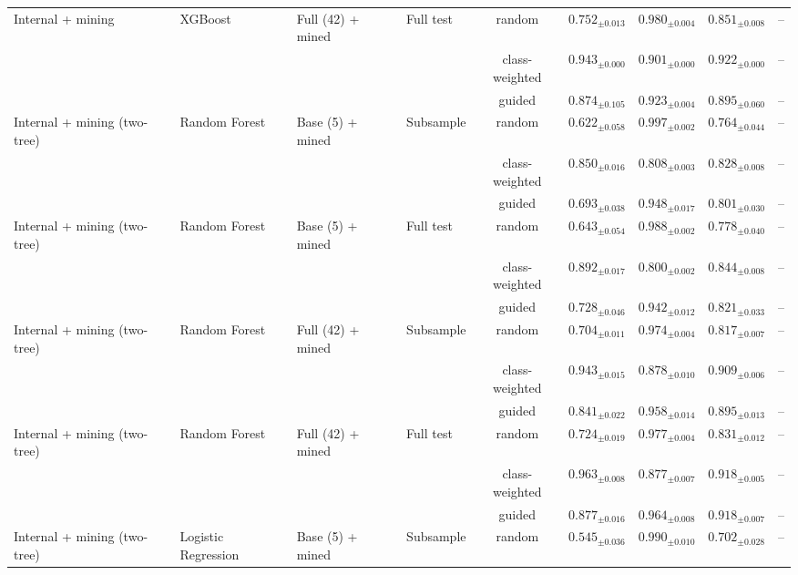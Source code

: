 \begin{longtable}{llllcccc}
\addlinespace
Internal + mining & XGBoost & Full (42) + mined & Full test & random & $0.752_{\pm 0.013}$ & $0.980_{\pm 0.004}$ & $0.851_{\pm 0.008}$ & -- \\
 &  &  &  & class-weighted & $0.943_{\pm 0.000}$ & $0.901_{\pm 0.000}$ & $0.922_{\pm 0.000}$ & -- \\
 &  &  &  & guided & $0.874_{\pm 0.105}$ & $0.923_{\pm 0.004}$ & $0.895_{\pm 0.060}$ & -- \\
\addlinespace
Internal + mining (two-tree) & Random Forest & Base (5) + mined & Subsample & random & $0.622_{\pm 0.058}$ & $0.997_{\pm 0.002}$ & $0.764_{\pm 0.044}$ & -- \\
 &  &  &  & class-weighted & $0.850_{\pm 0.016}$ & $0.808_{\pm 0.003}$ & $0.828_{\pm 0.008}$ & -- \\
 &  &  &  & guided & $0.693_{\pm 0.038}$ & $0.948_{\pm 0.017}$ & $0.801_{\pm 0.030}$ & -- \\
\addlinespace
Internal + mining (two-tree) & Random Forest & Base (5) + mined & Full test & random & $0.643_{\pm 0.054}$ & $0.988_{\pm 0.002}$ & $0.778_{\pm 0.040}$ & -- \\
 &  &  &  & class-weighted & $0.892_{\pm 0.017}$ & $0.800_{\pm 0.002}$ & $0.844_{\pm 0.008}$ & -- \\
 &  &  &  & guided & $0.728_{\pm 0.046}$ & $0.942_{\pm 0.012}$ & $0.821_{\pm 0.033}$ & -- \\
\addlinespace
Internal + mining (two-tree) & Random Forest & Full (42) + mined & Subsample & random & $0.704_{\pm 0.011}$ & $0.974_{\pm 0.004}$ & $0.817_{\pm 0.007}$ & -- \\
 &  &  &  & class-weighted & $0.943_{\pm 0.015}$ & $0.878_{\pm 0.010}$ & $0.909_{\pm 0.006}$ & -- \\
 &  &  &  & guided & $0.841_{\pm 0.022}$ & $0.958_{\pm 0.014}$ & $0.895_{\pm 0.013}$ & -- \\
\addlinespace
Internal + mining (two-tree) & Random Forest & Full (42) + mined & Full test & random & $0.724_{\pm 0.019}$ & $0.977_{\pm 0.004}$ & $0.831_{\pm 0.012}$ & -- \\
 &  &  &  & class-weighted & $0.963_{\pm 0.008}$ & $0.877_{\pm 0.007}$ & $0.918_{\pm 0.005}$ & -- \\
 &  &  &  & guided & $0.877_{\pm 0.016}$ & $0.964_{\pm 0.008}$ & $0.918_{\pm 0.007}$ & -- \\
\addlinespace
Internal + mining (two-tree) & Logistic Regression & Base (5) + mined & Subsample & random & $0.545_{\pm 0.036}$ & $0.990_{\pm 0.010}$ & $0.702_{\pm 0.028}$ & -- \\

\end{longtable}
